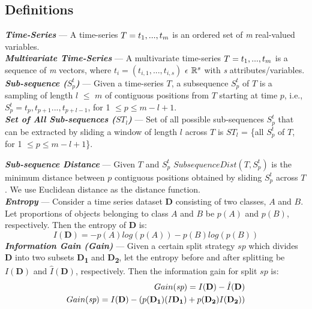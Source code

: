 \documentclass[conference]{IEEEtran}  %
\begin{document}
\subsection{Definitions}
\noindent
\textbf{\textit{Time-Series}} --- A time-series $T = t\textsubscript{1},..., t_m$ is an ordered set of \textit{m} real-valued variables.
\smallskip\\
\textbf{\textit{Multivariate Time-Series}} --- A multivariate time-series $T = t\textsubscript{1}, . . . , t_m$ is a sequence of \textit{m} vectors, where $t_i = (t_{i,1}, . . . , t_{i,s})$ $\epsilon$ $\mathbb{R}\textsuperscript{\(s\)}$ with \textit{s} attributes/variables.
\smallskip\\
\textbf{\textit{Sub-sequence ($S^t_p$)}} --- Given a time-series $T$, a subsequence $S^t_p$ of $T$ is a sampling of length $l$ \(\leq\) $m$ of contiguous positions from $T$ starting at time $p$, i.e., $S^t_p = t_p, t_{p+1}...,t_{p+l-1}$, for 1 \(\leq p \leq m - l + 1\).
\smallskip\\
\textbf{\textit{Set of All Sub-sequences ($ST_l$)}} --- Set of all possible sub-sequences $S^t_p$ that can be extracted by sliding a window of length $l$ across $T$ is $ST_l$ = \{all $S^t_p$ of $T$, for 1 \(\leq p \leq m - l + 1\)\}.

\enlargeeup
\noindent
\textbf{\textit{Sub-sequence Distance}} --- Given $T$ and $S^t_p$ \(SubsequenceDist(T,S^t_p)\) is the minimum distance between $p$ contiguous positions obtained by sliding $S^t_p$ across $T$. We use Euclidean distance as the distance function.
\smallskip\\
\textbf{\textit{Entropy}} --- Consider a time series dataset \textbf{D} consisting of two classes, $A$ and $B$. Let proportions of objects belonging to class $A$ and $B$ be $p(A)$ and $p(B)$, respectively. Then the entropy of \textbf{D} is:
\begin{equation}
 I(\textbf{D}) = -p(A)log(p(A)) - p(B)log(p(B))
 \label{eq:id}
\end{equation}
\noindent
\textbf{\textit{Information Gain (Gain)}} --- Given a certain split strategy $sp$ which divides \textbf{D} into two subsets \textbf{D\textsubscript{1}} and \textbf{D\textsubscript{2}}, let the entropy before and after splitting be $I(\textbf{D})$ and $\hat{I}(\textbf{D})$, respectively. Then the information gain for split $sp$ is:
\begin{equation}
\begin{split}
Gain(\textit{sp}) = I(\textbf{D}) - \hat{I}(\textbf{D})\\
Gain(\textit{sp}) = I(\textbf{D}) - (p(\textbf{D\textsubscript{1}})(I\textbf{D\textsubscript{1}})+p(\textbf{D\textsubscript{2}})I(\textbf{D\textsubscript{2}}))
\end{split}
\label{eq:gain}
\end{equation}
\end{document}
